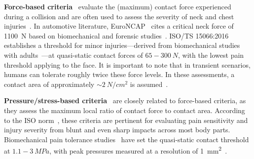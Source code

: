 \textbf{Force-based criteria}~\citep{kirschner2021experimental} evaluate the (maximum) contact force experienced during a collision and are often used to assess the severity of neck and chest injuries~\citep{haddadin2013towards}. In automotive literature, EuroNCAP~\citep{EuroNCAP2004} cites a critical neck force of \SI{1100}{N} based on biomechanical and forensic studies~\citep{madea2019handbuch, haddadin2009requirements}. ISO/TS 15066:2016~\citep{iso2016collaborative} establishes a threshold for minor injuries—derived from biomechanical studies with adults~\citep{muttray2014kollaborierende}—at quasi-static contact forces of $65-300~\si{N}$, with the lowest pain threshold applying to the face. It is important to note that in transient scenarios, humans can tolerate roughly twice these force levels. In these assessments, a contact area of approximately $\sim 2~\si{N \per cm^2}$ is assumed~\citep{iso2016collaborative}.

\textbf{Pressure/stress-based criteria}~\citep{wassink2007towards, haddadin2013towards} are closely related to force-based criteria, as they assess the maximum local ratio of contact force to contact area. According to the ISO norm~\citep{iso2016collaborative}, these criteria are pertinent for evaluating pain sensitivity and injury severity from blunt and even sharp impacts across most body parts. Biomechanical pain tolerance studies~\citep{muttray2014kollaborierende} have set the quasi-static contact threshold at $1.1-3~\si{MPa}$, with peak pressures measured at a resolution of \SI{1}{mm^2}~\citep{iso2016collaborative}.

